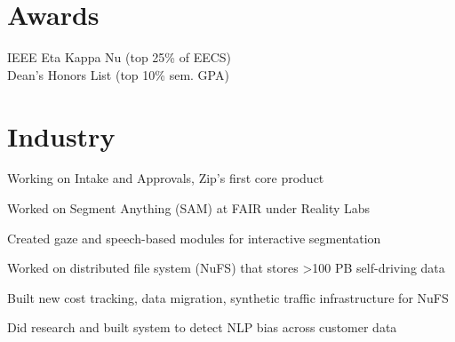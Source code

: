\documentclass[]{deedy-resume-openfont}
\begin{document}
\begin{minipage}[t]{0.33\textwidth}
\sectionsep

\section{Awards}
IEEE Eta Kappa Nu (top 25\% of EECS) \\
Dean's Honors List (top 10\% sem. GPA) \\
\sectionsep


%
%

\end{minipage} 
\hfill
\begin{minipage}[t]{0.66\textwidth} 


\section{Industry}
\vspace{\topsep} %
\begin{tightemize}
\item Working on Intake and Approvals, Zip's first core product
\end{tightemize}
\sectionsep

\begin{tightemize}
\item Worked on Segment Anything (SAM) at FAIR under Reality Labs
\item Created gaze and speech-based modules for interactive segmentation
\end{tightemize}
\sectionsep

\begin{tightemize}
\item  Worked on distributed file system (NuFS) that stores >100 PB self-driving data
\item Built new cost tracking, data migration, synthetic traffic infrastructure for NuFS
\end{tightemize}
\sectionsep

\begin{tightemize}
\item Did research and built system to detect NLP bias across customer data
\end{tightemize}
\sectionsep


\end{minipage}
\end{document}
